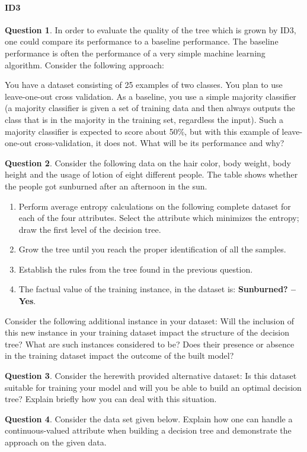\documentclass[11pt,a4paper]{article}
\theoremstyle{definition}%
\newtheorem{Q}{Question}[] %
\begin{document}
\paragraph{ID3}
\begin{Q}
In order to evaluate the quality of the tree which is grown by ID3, one could compare its performance
to a baseline performance. The baseline performance is often the performance of a very simple
machine learning algorithm. Consider the following approach:


You have a dataset consisting of 25 examples of two classes. You plan to use leave-one-out cross
validation. As a baseline, you use a simple majority classifier (a majority classifier is given a set of
training data and then always outputs the class that is in the majority in the training set, regardless
the input). Such a majority classifier is expected to score about 50\%, but with this example of
leave-one-out cross-validation, it does not. What will be its performance and why?
\end{Q}


\begin{Q}
Consider the following data on the hair color, body weight, body height and the usage of lotion of
eight different people. The table shows whether the people got sunburned after an afternoon in the
sun.
\begin{enumerate}
    \item Perform average entropy calculations on the following complete dataset for each of the four
    attributes. Select the attribute which minimizes the entropy; draw the first level of the decision
    tree.
    \item Grow the tree until you reach the proper identification of all the samples.
    \item Establish the rules from the tree found in the previous question.
    \item The factual value of the training instance, in the dataset is: \textbf{Sunburned? – Yes}. 
    \end{enumerate}
        Consider the following additional instance in your dataset:
Will the inclusion of this new instance in your training dataset impact the structure of the
decision tree? What are such instances considered to be? Does their presence or absence in
the training dataset impact the outcome of the built model?
\end{Q}

\begin{Q}
    Consider the herewith provided alternative dataset:
    Is this dataset suitable for training your model and will you be able to build an optimal decision
    tree? Explain briefly how you can deal with this situation.
\end{Q}

\begin{Q}
    Consider the data set given below. Explain how one can handle a continuous-valued attribute when
building a decision tree and demonstrate the approach on the given data.
\end{Q}
\end{document}
